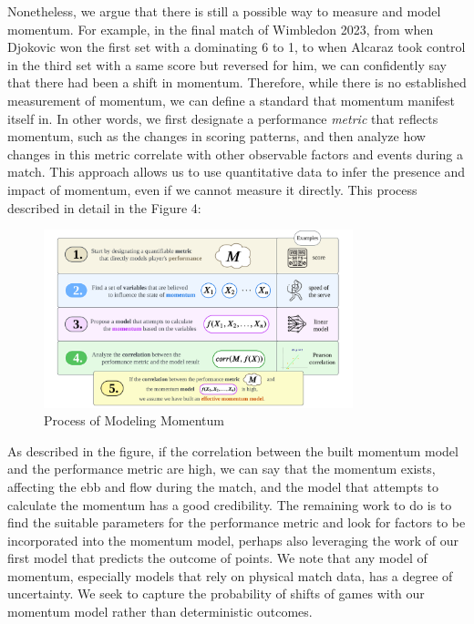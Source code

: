 \documentclass[12pt]{article}  %
\begin{document}
Nonetheless, we argue that there is still a possible way to measure and model momentum. For example, in the final match of Wimbledon 2023, from when Djokovic won the first set with a dominating 6 to 1, to when Alcaraz took control in the third set with a same score but reversed for him, we can confidently say that there had been a shift in momentum. Therefore, while there is no established measurement of momentum, we can define a standard that momentum manifest itself in. In other words, we first designate a performance \textit{metric} that reflects momentum, such as the changes in scoring patterns, and then analyze how changes in this metric correlate with other observable factors and events during a match. This approach allows us to use quantitative data to infer the presence and impact of momentum, even if we cannot measure it directly. This process described in detail in the Figure 4:

\begin{figure}[htbp]  %
	\centering  %
	\includegraphics[width=0.8\textwidth]{momentum-model.png} %
	\caption{\centering Process of Modeling Momentum} %
\end{figure}

As described in the figure, if the correlation between the built momentum model and the performance metric are high, we can say that the momentum exists, affecting the ebb and flow during the match, and the model that attempts to calculate the momentum has a good credibility. The remaining work to do is to find the suitable parameters for the performance metric and look for factors to be incorporated into the momentum model, perhaps also leveraging the work of our first model that predicts the outcome of points. We note that any model of momentum, especially models that rely on physical match data, has a degree of uncertainty. We seek to capture the probability of shifts of games with our momentum model rather than deterministic outcomes.
\end{document}

